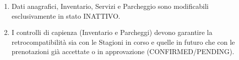 \documentclass[border=10pt]{standalone}
\begin{document}
	{
		\begin{enumerate}[nosep, leftmargin=*]
			\item[•] Dati anagrafici, Inventario, Servizi e Parcheggio sono modificabili esclusivamente in stato INATTIVO.
			\item[•] I controlli di capienza (Inventario e Parcheggi) devono garantire la retrocompatibilità sia con le Stagioni in corso e quelle in futuro che con le prenotazioni già accettate o in approvazione (CONFIRMED/PENDING).
		\end{enumerate}
	}
\end{document}
